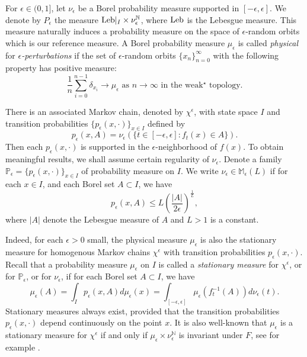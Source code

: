 \documentclass[11pt,oneside]{article}
\theoremstyle{plain}
\numberwithin{equation}{section}
\numberwithin{figure}{section}
\numberwithin{table}{section}
\begin{document}
For $\epsilon \in (0, 1]$,  let $\nu_{\epsilon}$ be a Borel probability measure supported in $[-\epsilon, \epsilon]$. We denote by $P_{\epsilon}$ the measure ${\rm Leb}|_I \times \nu_{\epsilon}^{\mathbb N} $, where ${\rm Leb}$ is the Lebesgue measure. This measure naturally induces a probability measure on the space of $\epsilon$-random orbits which is our reference measure.  A Borel probability measure $\mu_{\epsilon}$ is called {\it physical} for {\it $\epsilon$-perturbations} if the set of $\epsilon$-random orbits $\{ x_n \}_{n=0}^{\infty}$ with the following property has positive measure:
\[
\frac{1}{n} \sum_{i=0}^{n-1} \delta_{x_i} \to \mu_{\epsilon} \text{ as $n \to \infty$ in the weak$^{\star}$ topology}.
\]


There is an associated Markov chain, denoted by $\chi^{\epsilon}$, with state space $I$ and transition probabilities $\{p_{\epsilon}(x, \cdot) \}_{x \in I}$ defined by
\begin{equation}
p_{\epsilon} (x, A) = \nu_{\epsilon} (\{ t \in [-\epsilon, \epsilon] : f_t(x) \in A \}). 
\end{equation}
Then each $p_{\epsilon}(x, \cdot)$ is supported in the $\epsilon$-neighborhood of $f(x)$. To obtain meaningful results, we shall assume certain regularity of $\nu_{\epsilon}$. Denote a family $\mathbb P_{\epsilon} = \{p_{\epsilon}(x, \cdot) \}_{x \in I}$ of probability measure on $I$. We write $\nu_{\epsilon} \in \mathbb M_{\epsilon} (L)$ if for each $x \in I$, and each Borel set $A \subset I$, we have 
\begin{equation}
p_{\epsilon} (x, A) \leq L \left(\frac{|A|}{2 \epsilon} \right)^{\frac{1}{L}},
\end{equation}
where $|A|$ denote the Lebesgue measure of $A$ and $L>1$ is a constant.



Indeed, for each $\epsilon >0$ small, the physical measure $\mu_{\epsilon}$ is also the stationary measure for homogenous Markov chains $\chi^{\epsilon}$ with transition probabilities $p_{\epsilon}(x, \cdot)$. Recall that a probability measure $\mu_{\epsilon}$ on $I$ is called a {\it stationary measure} for $\chi^{\epsilon}$, or for $\mathbb P_{\epsilon}$, or for $\nu_{\epsilon}$, if for each Borel set $A \subset I$, we have
\begin{equation}
\mu_{\epsilon} (A) = \int_I p_{\epsilon} (x ,A)d \mu_{\epsilon}(x) = \int_{[-\epsilon, \epsilon]} \mu_{\epsilon} (f_t^{-1}(A)) d \nu_{\epsilon}(t).
\end{equation}
Stationary measures always exist, provided that the transition probabilities $p_{\epsilon}(x, \cdot)$ depend continuously on the point $x$. It is also well-known that $\mu_{\epsilon}$ is a stationary measure for $\chi^{\epsilon}$ if and only if $\mu_{\epsilon} \times \nu_{\epsilon}^{\mathbb N}$ is invariant under $F$, see for example \cite{Ki1, AA, AV}.
\end{document}

